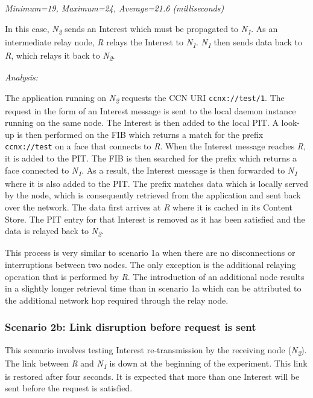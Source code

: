 \documentclass[a4paper,12pt]{report}      %
\begin{document}
\begin{center}\textsl{Minimum=19, Maximum=24, Average=21.6 (milliseconds)}\end{center}

In this case,  \emph{N\textsubscript{2}} sends an Interest which must be propagated to  \emph{N\textsubscript{1}}. As an intermediate relay
node,  \emph{R} relays the Interest to  \emph{N\textsubscript{1}}. \emph{N\textsubscript{1}} then sends data back to  \emph{R}, which relays it back to  \emph{N\textsubscript{2}}.

\vspace*{1\baselineskip}\noindent\emph{Analysis:}

The application running on  \emph{N\textsubscript{2}} requests the CCN URI \verb!ccnx://test/1!. The request in the form
of an Interest message is sent to the local daemon instance running on the same node. The Interest is
then added to the local PIT. A look-up is then performed on the FIB which returns a match for
 the prefix \verb!ccnx://test! on a face that connects to \emph{R}. 
When the Interest message reaches \emph{R}, it is added to the PIT. 
The FIB is then searched for the prefix which returns a face connected to \emph{N\textsubscript{1}}. As a result, the
Interest message is then forwarded to \emph{N\textsubscript{1}} where it is also added to the PIT. The prefix matches data
which is locally served by the node, which is consequently retrieved from the application and sent back
over the network. The data first arrives at \emph{R} where it is cached in its Content Store.
The PIT entry for that Interest is removed as it has been satisfied and the data is relayed back to  \emph{N\textsubscript{2}}.

This process is very similar to scenario 1a when there are no disconnections or interruptions
between two nodes. The only exception is the additional relaying operation that is performed by \emph{R}. 
The introduction of an additional node results in a slightly longer retrieval time than in scenario 1a which can be attributed to the additional network hop required through the relay node.

\subsubsection{Scenario 2b: Link disruption before request is sent}

This scenario involves testing Interest re-transmission by the receiving node (\emph{N\textsubscript{2}}). The link
between \emph{R} and \emph{N\textsubscript{1}} is down at the beginning of the experiment. This link is restored after
four seconds. It is expected that more than one Interest will be sent before the request is satisfied.
\end{document}
